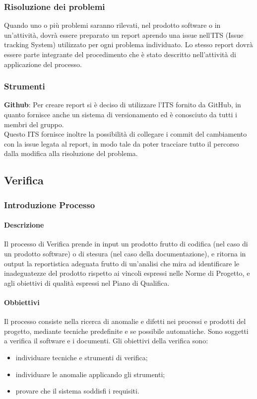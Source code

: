 		\subsubsection{Risoluzione dei problemi}
			Quando uno o più problemi saranno rilevati, nel prodotto software o in un'attività, dovrà essere preparato un report aprendo una issue nell'ITS (Issue tracking System) utilizzato per ogni problema individuato. Lo stesso report dovrà essere parte integrante del procedimento che è stato descritto nell'attività di applicazione del processo.
		\subsubsection{Strumenti}
			\textbf{Github}: Per creare report si è deciso di utilizzare l'ITS fornito da GitHub, in quanto fornisce anche un sistema di versionamento ed è conosciuto da tutti i membri del gruppo.\\
			Questo ITS fornisce inoltre la possibilità di collegare i commit del cambiamento con la issue legata al report, in modo tale da poter tracciare tutto il percorso dalla modifica alla risoluzione del problema.\\
	\subsection{Verifica}
		\subsubsection{Introduzione Processo}
			\paragraph{Descrizione}
				Il processo di Verifica prende in input un prodotto frutto di codifica (nel caso di un prodotto software) o di stesura (nel caso della documentazione), e ritorna in output la reportistica adeguata frutto di un’analisi che mira ad identificare le inadeguatezze del prodotto rispetto ai vincoli espressi nelle Norme di Progetto, e agli obiettivi di qualità espressi nel Piano di Qualifica. 
			\paragraph{Obbiettivi}
				Il processo consiste nella ricerca di anomalie e difetti nei processi e prodotti del progetto, mediante tecniche predefinite e se possibile automatiche. Sono soggetti a verifica il software e i documenti. Gli obiettivi della verifica sono:
				\begin{itemize}
					\item  individuare tecniche e strumenti di verifica;
					\item  individuare le anomalie applicando gli strumenti;
					\item  provare che il sistema soddisfi i requisiti.
				\end{itemize}
